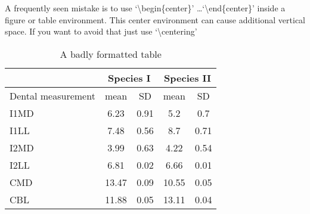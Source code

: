 A frequently seen mistake is to use `\textbackslash begin\{center\}' \dots `\textbackslash end\{center\}' inside a figure or table environment. This center environment can cause additional vertical space. If you want to avoid that just use `\textbackslash centering'


\begin{table}
  \caption{A badly formatted table}
  \centering
  \label{table:bad_table}
  \begin{tabular}{|l|c|c|c|c|}
    \hline
                       & \multicolumn{2}{c}{Species I} & \multicolumn{2}{c|}{Species II}                \\
    \hline
    Dental measurement & mean                          & SD                              & mean  & SD   \\ \hline
    \hline
    I1MD               & 6.23                          & 0.91                            & 5.2   & 0.7  \\
    \hline
    I1LL               & 7.48                          & 0.56                            & 8.7   & 0.71 \\
    \hline
    I2MD               & 3.99                          & 0.63                            & 4.22  & 0.54 \\
    \hline
    I2LL               & 6.81                          & 0.02                            & 6.66  & 0.01 \\
    \hline
    CMD                & 13.47                         & 0.09                            & 10.55 & 0.05 \\
    \hline
    CBL                & 11.88                         & 0.05                            & 13.11 & 0.04 \\
    \hline
  \end{tabular}
\end{table}

